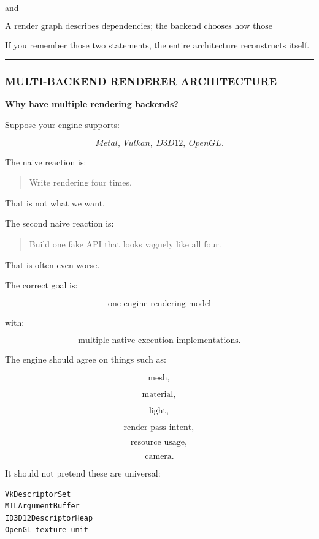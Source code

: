 and

\[
\boxed{
\text{A render graph describes dependencies;
the backend chooses how those dependencies become GPU commands.}
}
\]

If you remember those two statements, the entire architecture reconstructs itself.

\begin{center}\rule{0.5\linewidth}{0.5pt}\end{center}

\subsubsection{MULTI-BACKEND RENDERER ARCHITECTURE}\label{multi-backend-renderer-architecture}

\textbf{Why have multiple rendering backends?}

Suppose your engine supports:

\[
Metal,\ Vulkan,\ D3D12,\ OpenGL.
\]

The naive reaction is:

\begin{quote}
Write rendering four times.
\end{quote}

That is not what we want.

The second naive reaction is:

\begin{quote}
Build one fake API that looks vaguely like all four.
\end{quote}

That is often even worse.

The correct goal is:

\[
\boxed{
\text{one engine rendering model}
}
\]

with:

\[
\boxed{
\text{multiple native execution implementations}.
}
\]

The engine should agree on things such as:

\[
\text{mesh},
\]

\[
\text{material},
\]

\[
\text{light},
\]

\[
\text{render pass intent},
\]

\[
\text{resource usage},
\]

\[
\text{camera}.
\]

It should not pretend these are universal:

\begin{verbatim}
VkDescriptorSet
MTLArgumentBuffer
ID3D12DescriptorHeap
OpenGL texture unit
\end{verbatim}

